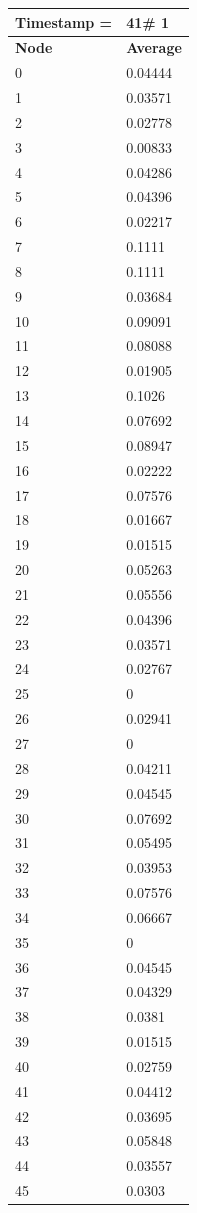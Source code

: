 \begin{tabular}{|l||l|}
\hline
\textbf{Timestamp =} & \textbf{41}\# 1\\\hline
	\textbf{Node} & \textbf{Average} \\ \hline
\hline
	0 & 0.04444 \\ \hline
	1 & 0.03571 \\ \hline
	2 & 0.02778 \\ \hline
	3 & 0.00833 \\ \hline
	4 & 0.04286 \\ \hline
	5 & 0.04396 \\ \hline
	6 & 0.02217 \\ \hline
	7 & 0.1111 \\ \hline
	8 & 0.1111 \\ \hline
	9 & 0.03684 \\ \hline
	10 & 0.09091 \\ \hline
	11 & 0.08088 \\ \hline
	12 & 0.01905 \\ \hline
	13 & 0.1026 \\ \hline
	14 & 0.07692 \\ \hline
	15 & 0.08947 \\ \hline
	16 & 0.02222 \\ \hline
	17 & 0.07576 \\ \hline
	18 & 0.01667 \\ \hline
	19 & 0.01515 \\ \hline
	20 & 0.05263 \\ \hline
	21 & 0.05556 \\ \hline
	22 & 0.04396 \\ \hline
	23 & 0.03571 \\ \hline
	24 & 0.02767 \\ \hline
	25 & 0 \\ \hline
	26 & 0.02941 \\ \hline
	27 & 0 \\ \hline
	28 & 0.04211 \\ \hline
	29 & 0.04545 \\ \hline
	30 & 0.07692 \\ \hline
	31 & 0.05495 \\ \hline
	32 & 0.03953 \\ \hline
	33 & 0.07576 \\ \hline
	34 & 0.06667 \\ \hline
	35 & 0 \\ \hline
	36 & 0.04545 \\ \hline
	37 & 0.04329 \\ \hline
	38 & 0.0381 \\ \hline
	39 & 0.01515 \\ \hline
	40 & 0.02759 \\ \hline
	41 & 0.04412 \\ \hline
	42 & 0.03695 \\ \hline
	43 & 0.05848 \\ \hline
	44 & 0.03557 \\ \hline
	45 & 0.0303 \\ \hline
\end{tabular}
